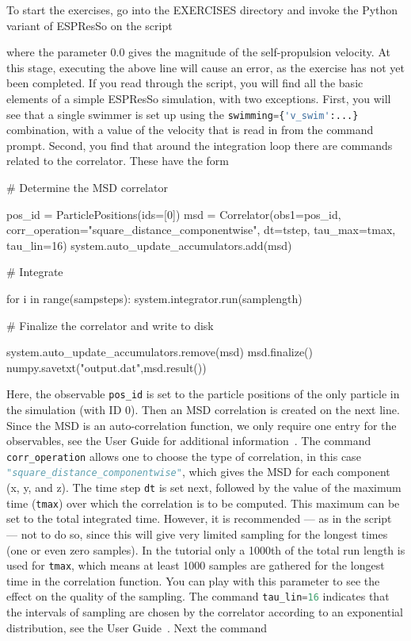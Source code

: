 \documentclass[aip,jcp,reprint,a4paper,onecolumn,amsmath]{revtex4-1}
\newcommand{\es}{\mbox{\textsf{ESPResSo}}\xspace}
\newcommand\codees{\lstinline[language=python]}
\begin{document}
To start the exercises, go into the EXERCISES directory and invoke the Python variant of \es{} on the script
where the parameter 0.0 gives the magnitude of the self-propulsion velocity. At this stage, executing the above line will cause an error, as the exercise has not yet been completed. If you read through the script, you will find all the basic elements of a simple \es{} simulation, with two exceptions. First, you will see that a single swimmer is set up using the \codees|swimming={'v_swim':...}| combination, with a value of the velocity that is read in from the command prompt. Second, you find that around the integration loop there are commands related to the correlator. These have the form
\begin{espresso}
# Determine the MSD correlator

pos_id = ParticlePositions(ids=[0])
msd = Correlator(obs1=pos_id,
                   corr_operation="square_distance_componentwise",
                   dt=tstep,
                   tau_max=tmax,
                   tau_lin=16)
system.auto_update_accumulators.add(msd)

# Integrate

for i in range(sampsteps):
    system.integrator.run(samplength)

# Finalize the correlator and write to disk

system.auto_update_accumulators.remove(msd)
msd.finalize()
numpy.savetxt("output.dat",msd.result())
\end{espresso}
Here, the observable \codees{pos_id} is set to the particle positions of the only particle in the simulation (with ID 0). Then an MSD correlation is created on the next line. Since the MSD is an auto-correlation function, we only require one entry for the observables, see the User Guide for additional information~\cite{UG}. The command \codees{corr_operation} allows one to choose the type of correlation, in this case \codees{"square_distance_componentwise"}, which gives the MSD for each component (x, y, and z). The time step \codees{dt} is set next, followed by the value of the maximum time (\codees{tmax}) over which the correlation is to be computed. This maximum can be set to the total integrated time. However, it is recommended --- as in the script --- not to do so, since this will give very limited sampling for the longest times (one or even zero samples). In the tutorial only a 1000th of the total run length is used for \codees{tmax}, which means at least 1000 samples are gathered for the longest time in the correlation function. You can play with this parameter to see the effect on the quality of the sampling. The command \codees{tau_lin=16} indicates that the intervals of sampling are chosen by the correlator according to an exponential distribution, see the User Guide~\cite{UG}. Next the command
\end{document}
